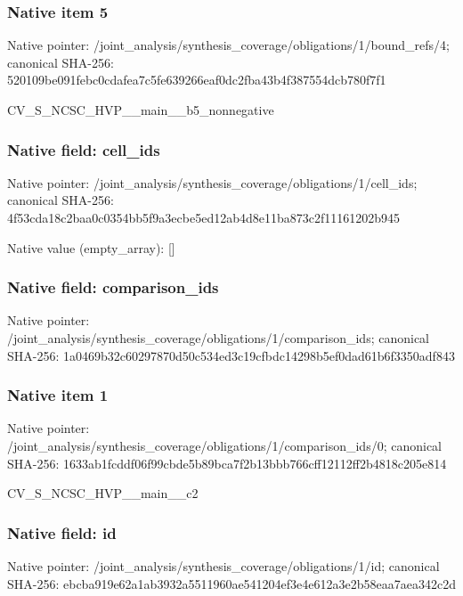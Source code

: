 \documentclass[10pt,a4paper]{article}
\begin{document}
\subsubsection{Native item 5}
Native pointer: /joint\_\allowbreak{}analysis/synthesis\_\allowbreak{}coverage/obligations/1/bound\_\allowbreak{}refs/4; canonical SHA-256: 520109be091febc0cdafea7c5fe639266eaf0dc2fba43b4f387554dcb780f7f1

\begingroup\raggedright\sloppy CV\_\allowbreak{}S\_\allowbreak{}NCSC\_\allowbreak{}HVP\_\allowbreak{}\_\allowbreak{}main\_\allowbreak{}\_\allowbreak{}b5\_\allowbreak{}nonnegative\par\endgroup

\subsubsection{Native field: cell\_\allowbreak{}ids}
Native pointer: /joint\_\allowbreak{}analysis/synthesis\_\allowbreak{}coverage/obligations/1/cell\_\allowbreak{}ids; canonical SHA-256: 4f53cda18c2baa0c0354bb5f9a3ecbe5ed12ab4d8e11ba873c2f11161202b945

Native value (empty\_\allowbreak{}array): []

\subsubsection{Native field: comparison\_\allowbreak{}ids}
Native pointer: /joint\_\allowbreak{}analysis/synthesis\_\allowbreak{}coverage/obligations/1/comparison\_\allowbreak{}ids; canonical SHA-256: 1a0469b32c60297870d50c534ed3c19cfbdc14298b5ef0dad61b6f3350adf843

\subsubsection{Native item 1}
Native pointer: /joint\_\allowbreak{}analysis/synthesis\_\allowbreak{}coverage/obligations/1/comparison\_\allowbreak{}ids/0; canonical SHA-256: 1633ab1fcddf06f99cbde5b89bca7f2b13bbb766cff12112ff2b4818c205e814

\begingroup\raggedright\sloppy CV\_\allowbreak{}S\_\allowbreak{}NCSC\_\allowbreak{}HVP\_\allowbreak{}\_\allowbreak{}main\_\allowbreak{}\_\allowbreak{}c2\par\endgroup

\subsubsection{Native field: id}
Native pointer: /joint\_\allowbreak{}analysis/synthesis\_\allowbreak{}coverage/obligations/1/id; canonical SHA-256: ebcba919e62a1ab3932a5511960ae541204ef3e4e612a3e2b58eaa7aea342c2d
\end{document}
